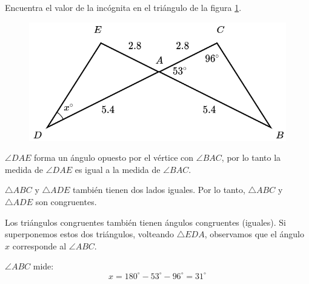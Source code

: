 Encuentra el valor de la incógnita en el triángulo de la figura \ref{fig:angle_triangle_35}.

\begin{minipage}[t][5cm][b]{0.3\textwidth}
    \begin{figure}[H]
        \centering
        \includegraphics[width=\linewidth]{../images/angle_triangle_35.png}
        \caption{}
        \label{fig:angle_triangle_35}
    \end{figure}
\end{minipage}\hfill
\begin{minipage}[t]{0.65\textwidth}
    \begin{solutionbox}{5cm}
        $\angle DAE$ forma un ángulo opuesto por el vértice con $\angle BAC$, por lo tanto la medida de $\angle DAE$ es igual a la medida de $\angle BAC$.

        $\triangle ABC$ y $\triangle ADE$ también tienen dos lados iguales. Por lo tanto,
        $\triangle ABC$ y $\triangle ADE$ son congruentes.

        Los triángulos congruentes también tienen ángulos congruentes (iguales). Si superponemos estos dos triángulos, volteando $\triangle EDA$, observamos que el ángulo $x$ corresponde al $\angle ABC$.

        $\angle ABC$ mide: \[x=180^\circ-53^\circ-96^\circ=31^\circ\]
    \end{solutionbox}
\end{minipage}
